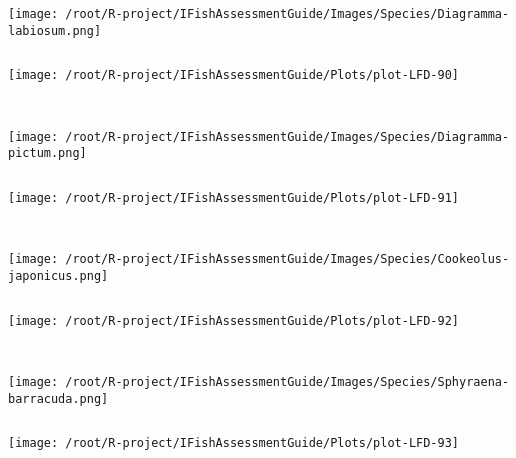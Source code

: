 \documentclass{report}\usepackage[]{graphicx}\usepackage[]{color}
\makeatletter
\def\maxwidth{ %
  \ifdim\Gin@nat@width>\linewidth
    \linewidth
  \else
    \Gin@nat@width
  \fi
}
\newenvironment{kframe}{%
 \def\at@end@of@kframe{}%
 \ifinner\ifhmode%
  \def\at@end@of@kframe{\end{minipage}}%
  \begin{minipage}{\columnwidth}%
 \fi\fi%
 \def\FrameCommand##1{\hskip\@totalleftmargin \hskip-\fboxsep
 \colorbox{shadecolor}{##1}\hskip-\fboxsep
     \hskip-\linewidth \hskip-\@totalleftmargin \hskip\columnwidth}%
 \MakeFramed {\advance\hsize-\width
   \@totalleftmargin\z@ \linewidth\hsize
   \@setminipage}}%
 {\par\unskip\endMakeFramed%
 \at@end@of@kframe}
\newenvironment{knitrout}{}{} %
\makeatother
\begin{document}
\begin{knitrout}
\begin{kframe}
\begin{verbatim}
\end{verbatim}
\end{kframe}
\texttt{[image: /root/R-project/IFishAssessmentGuide/Images/Species/Diagramma-labiosum.png]}
\begin{kframe}\begin{verbatim}
\end{verbatim}
\end{kframe}
\texttt{[image: /root/R-project/IFishAssessmentGuide/Plots/plot-LFD-90]} 
\begin{kframe}\begin{verbatim}
 
\end{verbatim}
\end{kframe}
\texttt{[image: /root/R-project/IFishAssessmentGuide/Images/Species/Diagramma-pictum.png]}
\begin{kframe}\begin{verbatim}
\end{verbatim}
\end{kframe}
\texttt{[image: /root/R-project/IFishAssessmentGuide/Plots/plot-LFD-91]} 
\begin{kframe}\begin{verbatim}
 
\end{verbatim}
\end{kframe}
\texttt{[image: /root/R-project/IFishAssessmentGuide/Images/Species/Cookeolus-japonicus.png]}
\begin{kframe}\begin{verbatim}
\end{verbatim}
\end{kframe}
\texttt{[image: /root/R-project/IFishAssessmentGuide/Plots/plot-LFD-92]} 
\begin{kframe}\begin{verbatim}
 
\end{verbatim}
\end{kframe}
\texttt{[image: /root/R-project/IFishAssessmentGuide/Images/Species/Sphyraena-barracuda.png]}
\begin{kframe}\begin{verbatim}
\end{verbatim}
\end{kframe}
\texttt{[image: /root/R-project/IFishAssessmentGuide/Plots/plot-LFD-93]} 
\begin{kframe}\begin{verbatim}
 

\end{verbatim}
\end{kframe}
\end{knitrout}
\end{document}
